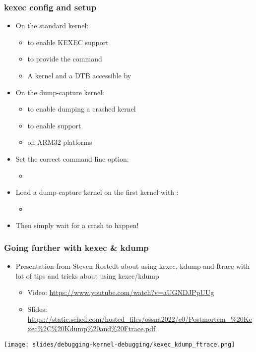 \begin{frame}[fragile]
  \frametitle{kexec config and setup}
  \begin{itemize}
    \item On the standard kernel:
    \begin{itemize}
      \item {} to enable KEXEC support
      \item {} to provide the  command
      \item A kernel and a DTB accessible by 
    \end{itemize}
    \item On the dump-capture kernel:
    \begin{itemize}
      \item {} to enable dumping a crashed
            kernel
      \item {} to enable 
        support
      \item {} on ARM32 platforms
    \end{itemize}
    \item Set the correct  command line option:
    \begin{itemize}
      \item {}
    \end{itemize}
    \item Load a dump-capture kernel on the first kernel with :
    \begin{itemize}
      \item {}
    \end{itemize}
    \item Then simply wait for a crash to happen!
  \end{itemize}
\end{frame}

\begin{frame}[fragile]
  \frametitle{Going further with kexec \& kdump}
  \begin{itemize}
    \item Presentation from Steven Rostedt about using kexec, kdump and ftrace
          with lot of tips and tricks about using kexec/kdump
    \begin{itemize}
      \item Video: \url{https://www.youtube.com/watch?v=aUGNDJPpUUg}
      \item Slides: \url{https://static.sched.com/hosted_files/ossna2022/c0/Postmortem_%20Kexec%2C%20Kdump%20and%20Ftrace.pdf}
    \end{itemize}
  \end{itemize}
  \vspace{0.1cm}
  \begin{center}
  \center\texttt{[image: slides/debugging-kernel-debugging/kexec\_kdump\_ftrace.png]}
  \end{center}
\end{frame}

